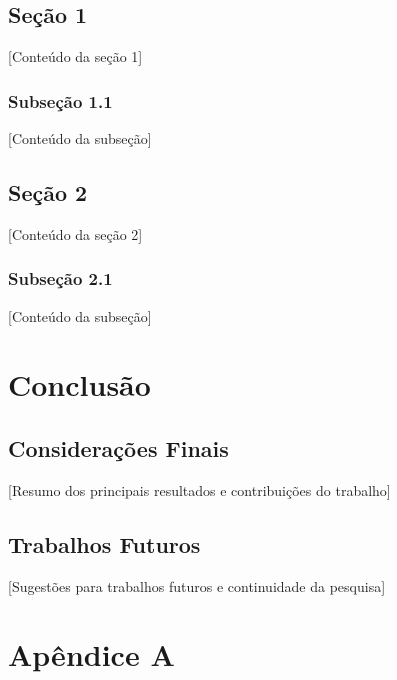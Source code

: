 \documentclass[
12pt,
openright,
oneside,
a4paper,
chapter=TITLE,
section=TITLE,
french,
spanish,
brazil,
brazil
]{abntex2}
\begin{document}
\section{Seção 1}\label{seuxe7uxe3o-1}

{[}Conteúdo da seção 1{]}

\subsection{Subseção 1.1}\label{subseuxe7uxe3o-1.1}

{[}Conteúdo da subseção{]}

\section{Seção 2}\label{seuxe7uxe3o-2}

{[}Conteúdo da seção 2{]}

\subsection{Subseção 2.1}\label{subseuxe7uxe3o-2.1}

{[}Conteúdo da subseção{]}


\chapter{Conclusão}\label{sec-conclusion}

\section{Considerações Finais}\label{considerauxe7uxf5es-finais}

{[}Resumo dos principais resultados e contribuições do trabalho{]}

\section{Trabalhos Futuros}\label{trabalhos-futuros}

{[}Sugestões para trabalhos futuros e continuidade da pesquisa{]}

\cleardoublepage
{}
{}
\appendix

\chapter*{Apêndice A}\label{apuxeandice-a}
\end{document}
